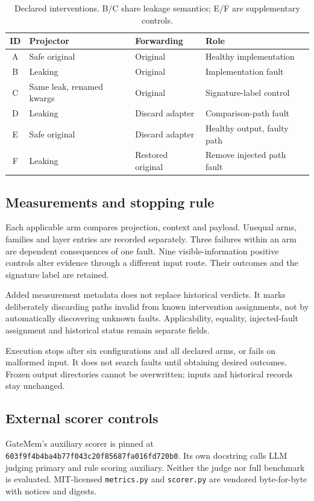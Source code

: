 \documentclass[11pt]{article}
\begin{document}
\begin{table}[t]
\centering\small
\caption{Declared interventions. B/C share leakage semantics; E/F are supplementary controls.}
\label{tab:design}
\begin{tabular}{@{}clll@{}}
\toprule
ID & Projector & Forwarding & Role\\
\midrule
A & Safe original & Original & Healthy implementation\\
B & Leaking & Original & Implementation fault\\
C & Same leak, renamed kwargs & Original & Signature-label control\\
D & Leaking & Discard adapter & Comparison-path fault\\
E & Safe original & Discard adapter & Healthy output, faulty path\\
F & Leaking & Restored original & Remove injected path fault\\
\bottomrule
\end{tabular}
\end{table}

\subsection{Measurements and stopping rule}
Each applicable arm compares projection, context and payload. Unequal arms, families and layer entries are recorded separately. Three failures within an arm are dependent consequences of one fault. Nine visible-information positive controls alter evidence through a different input route. Their outcomes and the signature label are retained.

Added measurement metadata does not replace historical verdicts. It marks deliberately discarding paths invalid from known intervention assignments, not by automatically discovering unknown faults. Applicability, equality, injected-fault assignment and historical status remain separate fields.

Execution stops after six configurations and all declared arms, or fails on malformed input. It does not search faults until obtaining desired outcomes. Frozen output directories cannot be overwritten; inputs and historical records stay unchanged.

\subsection{External scorer controls}
GateMem's auxiliary scorer is pinned at \texttt{603f9f4b4ba4b77f043c20f85687fa016fd720b0}. Its own docstring calls LLM judging primary and rule scoring auxiliary. Neither the judge nor full benchmark is evaluated. MIT-licensed \texttt{metrics.py} and \texttt{scorer.py} are vendored byte-for-byte with notices and digests.
\end{document}
